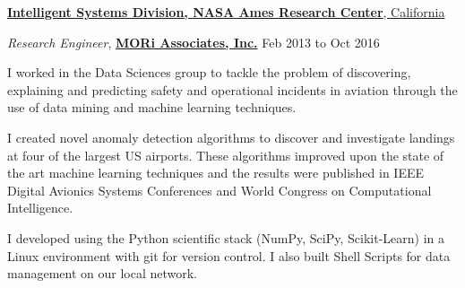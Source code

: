 \documentclass[10pt]{article}
\newenvironment{outerlist}[1][\enskip$\circ$]%
        {\begin{itemize}[#1]}{\end{itemize}%
         \vspace{-.6\baselineskip}}
\newenvironment{innerlist}[1][\enskip$\circ$]%
        {\begin{compactitem}[#1]}{\end{compactitem}}
\begin{document}
\href{http://ti.arc.nasa.gov/}{\textbf{Intelligent Systems Division, NASA Ames Research Center}, California}
\begin{outerlist}
\item[] \textit{Research Engineer}, \href{http://www.moriassociates.com/}{\textbf{MORi Associates, Inc.}} %
\hfill{Feb 2013 to Oct 2016}

  \begin{innerlist}
    \item I worked in the Data Sciences group to tackle the problem of discovering, explaining and predicting safety and operational incidents in aviation through the use of data mining and machine learning techniques.
    \item I created novel anomaly detection algorithms to discover and investigate landings at four of the largest US airports. These algorithms improved upon the state of the art machine learning techniques and the results were published in {\sc IEEE Digital Avionics Systems Conferences} and { World Congress on Computational Intelligence}.
    \item I developed using the {\sc Python} scientific stack ({\sc NumPy, SciPy, Scikit-Learn}) in a  {\sc Linux} environment with {\sc git} for version control. I also built {\sc Shell Scripts} for data management on our local network.

\end{innerlist}
\end{outerlist}
\end{document}
